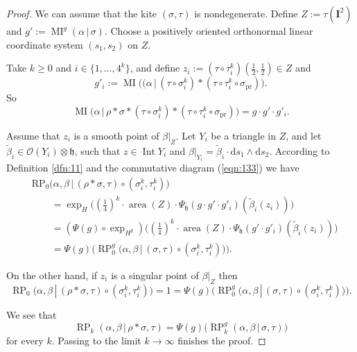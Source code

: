 \documentclass[10pt, a4paper]{amsart}
\theoremstyle{definition}
\numberwithin{equation}{section}
\newcommand{\opn}{\operatorname}
\newcommand{\mfrak}[1]{\mathfrak{#1}}
\newcommand{\mcal}[1]{\mathcal{#1}}
\newcommand{\mbf}[1]{\mathbf{#1}}
\newcommand{\mrm}[1]{\mathrm{#1}}
\newcommand{\smfrac}[2]{{\textstyle \frac{#1}{#2}}}
\newcommand{\til}[1]{\tilde{#1}}
\renewcommand{\vert}{\, | \,}
\newcommand{\h}{\mfrak{h}}
\renewcommand{\d}{\mrm{d}}
\begin{document}
\begin{proof}
We can assume that the kite $(\sigma, \tau)$ is nondegenerate. Define
$Z := \tau(\mbf{I}^2)$ and $g' := \opn{MI}^g(\alpha \vert \sigma)$.
Choose a positively oriented orthonormal linear coordinate system 
$(s_1, s_2)$ on $Z$.

Take $k \geq 0$ and $i \in \{ 1, \ldots, 4^k \}$, and 
define
$z_i := (\tau \circ \tau^k_i)(\smfrac{1}{2}, \smfrac{1}{2}) \in Z$
and
\[ g'_i := \opn{MI} \bigl( (\alpha \vert (\tau \circ \sigma^k_i) * 
(\tau \circ \tau^k_i \circ \sigma_{\opn{pr}}) \bigr) . \]
So
\[ \opn{MI} \bigl( \alpha \vert
\rho * \sigma * (\tau \circ \sigma^k_i) * 
(\tau \circ \tau^k_i \circ \sigma_{\opn{pr}})  \bigr) = 
g \cdot g' \cdot g'_i . \]

Assume that $z_i$ is a smooth point of $\beta|_Z$. Let $Y_i$ be a triangle
in $Z$, and let $\til{\beta}_i \in \mcal{O}(Y_i) \otimes \h$, such that
$z \in \opn{Int} Y_i$ and 
$\beta|_{Y_i} = \til{\beta}_i \cdot \d s_1 \wedge \d s_2$. According to 
Definition \ref{dfn:11}  and the commutative diagram (\ref{eqn:133}) we have
\[ \begin{aligned}
& \opn{RP_0} \bigl( \alpha, \beta \vert (\rho * \sigma, \tau) \circ 
(\sigma^k_i, \tau^k_i) \bigr) \\
& \qquad = 
\exp_H \bigl( (\smfrac{1}{4})^k \cdot \opn{area}(Z) \cdot 
\Psi_{\h}(g \cdot g' \cdot g'_i) (\til{\beta}_i(z_i)) \bigr) \\
& \qquad =
(\Psi(g) \circ \exp_{H^g}) \bigl( (\smfrac{1}{4})^k \cdot \opn{area}(Z) \cdot 
\Psi_{\h}(g' \cdot g'_i) (\til{\beta}_i(z_i)) \bigr) \\
& \qquad =
\Psi(g) \bigl( \opn{RP}_0^g \bigl( \alpha, \beta \vert 
(\sigma, \tau) \circ (\sigma^k_i, \tau^k_i) \bigr) \bigr) .
\end{aligned} \]

On the other hand, if $z_i$ is a singular point of $\beta|_Z$ then 
\[ \opn{RP}_0 \bigl( \alpha, \beta \vert (\rho * \sigma, \tau) \circ 
(\sigma^k_i, \tau^k_i) \bigr) = 1 =
\Psi(g) \bigl( \opn{RP}_0^g \bigl( \alpha, \beta \vert 
(\sigma, \tau) \circ (\sigma^k_i, \tau^k_i) \bigr) \bigr) . \]

We see that
\[ \opn{RP}_k (\alpha, \beta \vert \rho * \sigma, \tau) =
\Psi(g) \bigl( \opn{RP}_k^g ( \alpha, \beta \vert \sigma, \tau) \bigr) \]
for every $k$.
Passing to the limit $k \to  \infty$ finishes the proof.
\end{proof}
\end{document}
